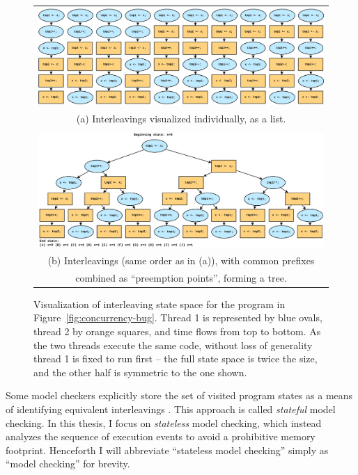 \begin{figure}[p]
	\begin{tabular}{c}
		\includegraphics[width=\textwidth]{statespace-list.pdf}
		\\
		(a) Interleavings visualized individually, as a list.
		\\
		\\
		\includegraphics[width=\textwidth]{statespace-tree.pdf}
		\\
		(b) Interleavings (same order as in (a)), with common prefixes \\
		combined as ``preemption points'', forming a tree.
	\end{tabular}
	\caption{Visualization of interleaving state space for the program in Figure~\ref{fig:concurrency-bug}.
	Thread 1 is represented by blue ovals, thread 2 by orange squares, and time flows from top to bottom.
	As the two threads execute the same code, without loss of generality thread 1 is fixed to run first --
	the full state space is twice the size, and the other half is symmetric to the one shown.}
	\label{fig:tree}
\end{figure}

Some model checkers explicitly store the set of visited program states as a means of identifying equivalent interleavings \cite{spin}.
This approach is called {\em stateful} model checking.
In this thesis, I focus on {\em stateless} model checking,
which instead analyzes the sequence of execution events to avoid a prohibitive memory footprint.
Henceforth I will abbreviate ``stateless model checking'' simply as ``model checking'' for brevity.

